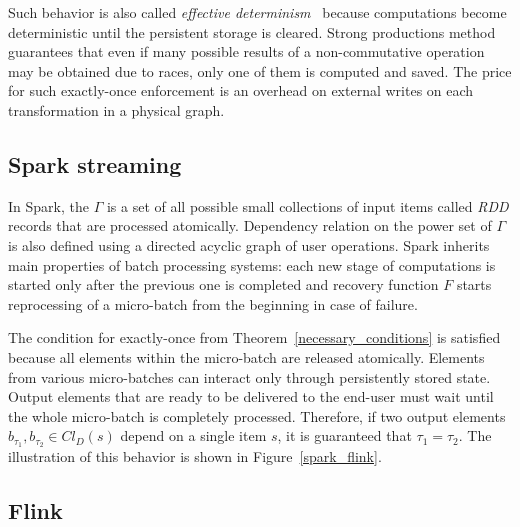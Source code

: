 Such behavior is also called {\em effective determinism}~\cite{akidau2018streaming} because computations become deterministic until the persistent storage is cleared. Strong productions method guarantees that even if many possible results of a non-commutative operation may be obtained due to races, only one of them is computed and saved. The price for such exactly-once enforcement is an overhead on external writes on each transformation in a physical graph.

\subsection{Spark streaming}

In Spark, the  $\Gamma$   is a set of all possible small collections of input items called  {\em RDD} records that are processed atomically.
Dependency relation on the power set of $\Gamma$ is also defined using a directed acyclic graph of user operations. 
Spark inherits main properties of batch processing systems:  each new stage of computations is started only after the previous one is completed and recovery function $F$ starts reprocessing of a micro-batch from the beginning in case of failure.

The condition for exactly-once from Theorem~\ref{necessary_conditions} is satisfied because all elements within the micro-batch are released atomically. Elements from various micro-batches can interact only through persistently stored state. 
Output elements that are ready to be delivered to the end-user must wait until the whole micro-batch is completely processed. 
Therefore, if two output elements $b_{\tau_1},b_{\tau_2} \in Cl_D(s)$ depend on a single item $s$, it is guaranteed that $\tau_1=\tau_2$. The illustration of this behavior is shown in Figure~\ref{spark_flink}. 
 

\subsection{Flink}

